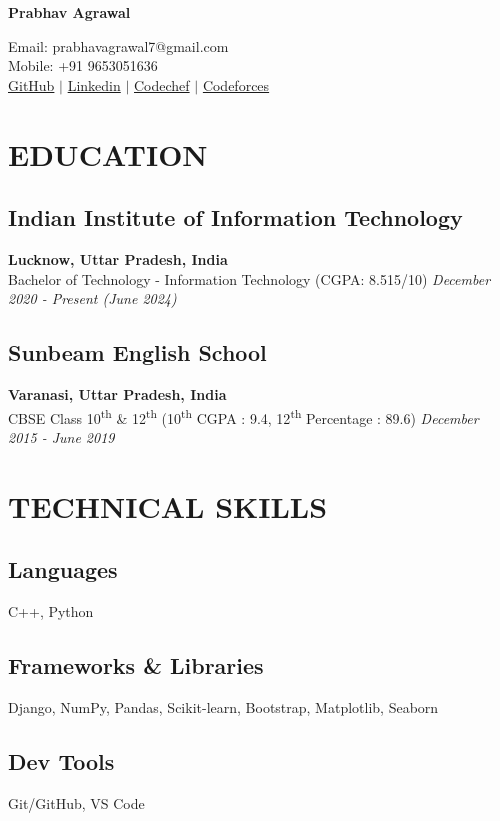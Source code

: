 \documentclass[12pt]{article}
\newcommand{\resumename}[1]{\LARGE\textbf{#1} \hfill \small}
\begin{document}
\noindent
\resumename{Prabhav Agrawal} \raggedright Email: prabhavagrawal7@gmail.com \\
\hfill Mobile: +91 9653051636 \\
\href{https://github.com/prabhavagrawal7}{GitHub} $\vert$
\href{https://www.linkedin.com/in/prabhavagrawal7/}{Linkedin} $\vert$
\href{https://www.codechef.com/users/prabhav7}{Codechef} $\vert$
\href{https://codeforces.com/profile/prabhavagrawal7}{Codeforces} 
\section*{EDUCATION}
\subsection*{Indian Institute of Information Technology}      \hfill \textbf{Lucknow, Uttar Pradesh, India} \\
Bachelor of Technology - Information Technology (CGPA: 8.515/10) \hfill \textit{December 2020 - Present (June 2024)} \\
\subsection*{Sunbeam English School}                       \hfill \textbf{Varanasi, Uttar Pradesh, India} \\
CBSE Class 10\textsuperscript{th} \& 12\textsuperscript{th} (10\textsuperscript{th} CGPA : 9.4, 12\textsuperscript{th} Percentage : 89.6) \hfill \textit{December 2015 - June 2019} \\ 
\section*{TECHNICAL SKILLS}
\subsection*{Languages}               \hspace*{4.4cm} C++, Python \\
\subsection*{Frameworks \& Libraries} \hspace*{1.74cm} Django, NumPy, Pandas, Scikit-learn, Bootstrap, Matplotlib, Seaborn\\
\subsection*{Dev Tools}               \hspace*{4.45cm} Git/GitHub, VS Code \\ 
\end{document}
